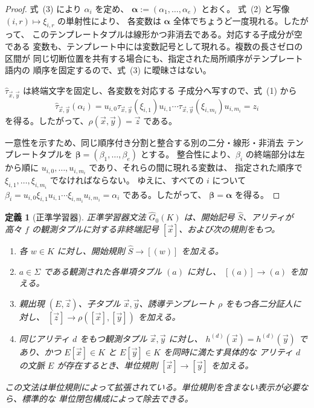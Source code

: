 \documentclass[11pt,a4paper]{ltjsarticle}
\newtheorem{definition}[theorem]{定義}
\theoremstyle{remark}
\newcommand{\tuple}[1]{\vec{#1}}
\begin{document}
\begin{proof}
式~\textup{(3)} により \(\alpha_i\) を定め、
\(\boldsymbol\alpha:=(\alpha_1,\ldots,\alpha_e)\) とおく。
式~\textup{(2)} と写像 \((i,r)\mapsto\xi_{i,r}\) の単射性により、
各変数は \(\boldsymbol\alpha\) 全体でちょうど一度現れる。したがって、
このテンプレートタプルは線形かつ非消去である。対応する子成分が空である
変数も、テンプレート中には変数記号として現れる。複数の長さゼロの区間が
同じ切断位置を共有する場合にも、指定された局所順序がテンプレート語内の
順序を固定するので、式~\textup{(3)} に曖昧さはない。

\(\widehat\tau_{\tuple x,\tuple y}\) は終端文字を固定し、各変数を対応する
子成分へ写すので、式~\textup{(1)} から
\[
  \widehat\tau_{\tuple x,\tuple y}(\alpha_i)
  =u_{i,0}\tau_{\tuple x,\tuple y}(\xi_{i,1})u_{i,1}\cdots
   \tau_{\tuple x,\tuple y}(\xi_{i,m_i})u_{i,m_i}
  =z_i
\]
を得る。したがって、\(\rho(\tuple x,\tuple y)=\tuple z\) である。

一意性を示すため、同じ順序付き分割と整合する別の二分・線形・非消去
テンプレートタプルを
\(\boldsymbol\beta=(\beta_1,\ldots,\beta_e)\) とする。
整合性により、\(\beta_i\) の終端部分は左から順に
\(u_{i,0},\ldots,u_{i,m_i}\) であり、それらの間に現れる変数は、
指定された順序で \(\xi_{i,1},\ldots,\xi_{i,m_i}\) でなければならない。
ゆえに、すべての \(i\) について
\(\beta_i=u_{i,0}\xi_{i,1}u_{i,1}\cdots
\xi_{i,m_i}u_{i,m_i}=\alpha_i\) である。したがって、
\(\boldsymbol\beta=\boldsymbol\alpha\) を得る。
\end{proof}


\begin{definition}[正準学習器]
\label{def:learner}
正準学習器文法 \(\widehat G_0(K)\) は、開始記号 \(\widehat S\)、アリティが高々
\(f\) の観測タプルに対する非終端記号 \([\tuple x]\)、および次の規則をもつ。
\begin{enumerate}[label=(\roman*),leftmargin=*]
\item 各 \(w\in K\) に対し、開始規則 \(\widehat S\to[(w)]\) を加える。
\item \(a\in\Sigma\) である観測された各単項タプル \((a)\) に対し、
\([(a)]\to(a)\) を加える。
\item 親出現 \((E,\tuple z)\)、子タプル \(\tuple x,\tuple y\)、誘導テンプレート
\(\rho\) をもつ各二分証人に対し、
\([\tuple z]\to\rho([\tuple x],[\tuple y])\) を加える。
\item 同じアリティ \(d\) をもつ観測タプル \(\tuple x,\tuple y\) に対し、
\(h^{(d)}(\tuple x)=h^{(d)}(\tuple y)\) であり、かつ
\(E[\tuple x]\in K\) と \(E[\tuple y]\in K\) を同時に満たす具体的な
アリティ \(d\) の文脈 \(E\) が存在するとき、単位規則
\([\tuple x]\to[\tuple y]\) を加える。
\end{enumerate}
この文法は単位規則によって拡張されている。単位規則を含まない表示が必要なら、標準的な
単位閉包構成によって除去できる。
\end{definition}
\end{document}
